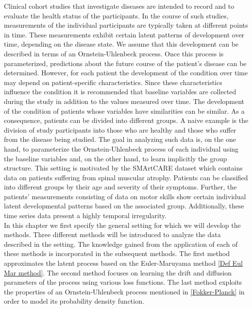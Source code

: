 \documentclass[11pt,titlepage]{article}
\theoremstyle{definition}
\theoremstyle{remark}
\begin{document}
	Clinical cohort studies that investigate diseases are intended to record and to evaluate the health status of the participants. In the course of such studies, measurements of the individual participants are typically taken at different points in time. These measurements exhibit certain latent patterns of development over time, depending on the disease state. We assume that this development can be described in terms of an Ornstein-Uhlenbeck process. Once this process is parameterized, predictions about the future course of the patient's disease can be determined. However, for each patient the development of the condition over time may depend on patient-specific characteristics. Since these characteristics influence the condition it is recommended that baseline variables are collected during the study in addition to the values measured over time. The development of the condition of patients whose variables have similarities can be similar. As a consequence, patients can be divided into different groups. A naive example is the division of study participants into those who are healthy and those who suffer from the disease being studied. The goal in analyzing such data is, on the one hand, to parameterize the Ornstein-Uhlenbeck process of each individual using the baseline variables and, on the other hand, to learn implicitly the group structure. This setting is motivated by the SMArtCARE dataset which contains data on patients suffering from spinal muscular atrophy. Patients can be classified into different groups by their age and severity of their symptoms. Further, the patients' measurements consisting of data on motor skills show certain individual latent developmental patterns based on the associated group. %
	Additionally, these time series data present a highly temporal irregularity.\\
	In this chapter we first specify the general setting for which we will develop the methods. Three different methods will be introduced to analyze the data described in the setting. The knowledge gained from the application of each of these methods is incorporated in the subsequent methods. The first method approximates the latent process based on the Euler-Maruyama method \ref{Def Eul Mar method}. The second method focuses on learning the drift and diffusion parameters of the process using various loss functions. The last method exploits the properties of an Ornstein-Uhlenbeck process mentioned in \ref{Fokker-Planck} in order to model its probability density function. 
	
\end{document}
